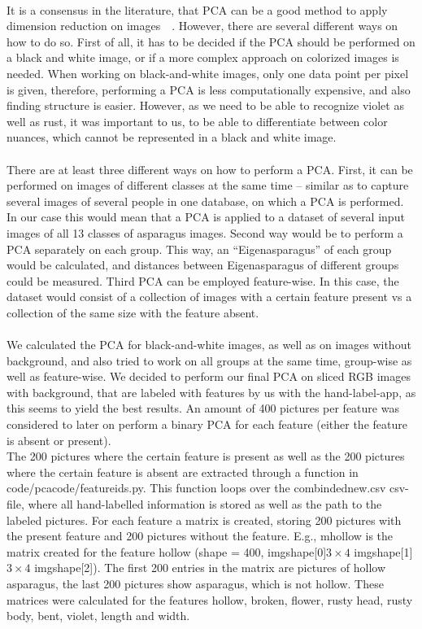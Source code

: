 \\
It is a consensus in the literature, that PCA can be a good method to apply dimension reduction on images~\citep{turk1991face}~\citep{lata2009}.
However, there are several different ways on how to do so. First of all, it has to be decided if the PCA should be performed on a black and white image, or if a more complex approach on colorized images is needed. When working on black-and-white images, only one data point per pixel is given, therefore, performing a PCA is less computationally expensive, and also finding structure is easier. However, as we need to be able to recognize violet as well as rust, it was important to us, to be able to differentiate between color nuances, which cannot be represented in a black and white image. \\
 \\
There are at least three different ways on how to perform a PCA. First, it can be performed on images of different classes at the same time – similar as to capture several images of several people in one database, on which a PCA is performed. In our case this would mean that a PCA is applied to a dataset of several input images of all 13 classes of asparagus images. Second way would be to perform a PCA separately on each group. This way, an “Eigenasparagus” of each group would be calculated, and distances between Eigenasparagus of different groups could be measured. Third PCA can be employed feature-wise. In this case, the dataset would consist of a collection of images with a certain feature present vs a collection of the same size with the feature absent. \\
 \\
We calculated the PCA for black-and-white images, as well as on images without background, and also tried to work on all groups at the same time, group-wise as well as feature-wise. We decided to perform our final PCA on sliced RGB images with background, that are labeled with features by us with the hand-label-app, as this seems to yield the best results. An amount of 400 pictures per feature was considered to later on perform a binary PCA for each feature (either the feature is absent or present). \\
The 200 pictures where the certain feature is present as well as the 200 pictures where the certain feature is absent are extracted through a function in code/pca\textunderscore code/feature\textunderscore ids.py. This function loops over the combinded\textunderscore new.csv csv-file, where all hand-labelled information is stored as well as the path to the labeled pictures. For each feature a matrix is created, storing 200 pictures with the present feature and 200 pictures without the feature. E.g., m\textunderscore hollow is the matrix created for the feature hollow (shape = 400, img\textunderscore shape[0]$3\times4$ img\textunderscore shape[1]$3\times4$ img\textunderscore shape[2]). The first 200 entries in the matrix are pictures of hollow asparagus, the last 200 pictures show asparagus, which is not hollow. These matrices were calculated for the features hollow, broken, flower, rusty head, rusty body, bent, violet, length and width. \\

